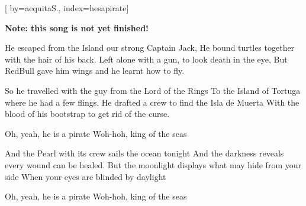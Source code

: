 
[%
    by={aequitaS.},
    index={hesapirate}]


    \label{hesapirate}

    \textbf{Note: this song is not yet finished!}

    \beginverse
        He escaped from the Island our strong Captain Jack,
        He bound turtles together with the hair of his back.
        Left alone with a gun, to look death in the eye,
        But RedBull gave him wings and he learnt how to fly.
    \endverse

    \beginverse
        So he travelled with the guy from the Lord of the Rings
        To the Island of Tortuga where he had a few flings.
        He drafted a crew to find the Isla de Muerta
        With the blood of his bootstrap to get rid of the curse.
    \endverse

    \beginchorus
        \lrep Oh, yeah, he is a pirate
        Woh-hoh, king of the seas \rrep {}
    \endchorus

    \beginverse*
        And the Pearl with its crew sails the ocean tonight
        And the darkness reveals every wound can be healed.
        But the moonlight displays what may hide from your side
        When your eyes are blinded by daylight
    \endverse

    \beginchorus
        \lrep Oh, yeah, he is a pirate
        Woh-hoh, king of the seas \rrep {}
    \endchorus
\endsong

